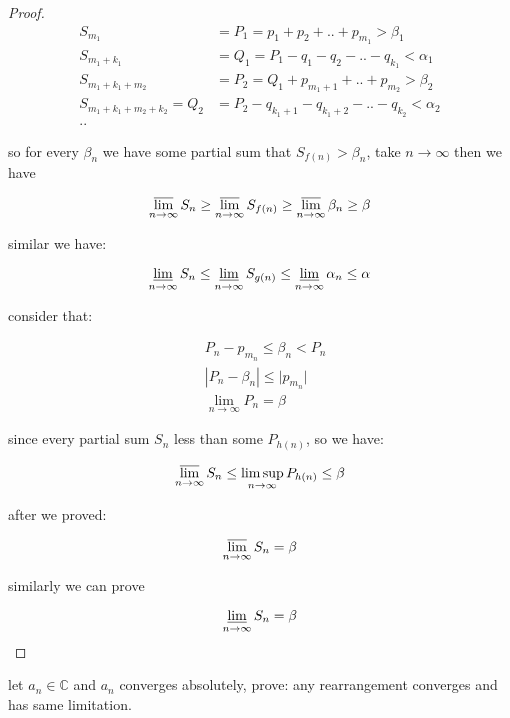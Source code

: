 \begin{proof}
    \begin{align*}
        S_{m_1} & = P_1 = p_1 + p_2 + .. + p_{m_1} > \beta_1\\
        S_{m_1 + k_1} &= Q_1 = P_1 - q_1 -q_2 - .. - q_{k_1} < \alpha_1 \\
        S_{m_1 + k_1 + m_2}  &= P_2 = Q_1 + p_{m_1 + 1} + .. + p_{m_2} > \beta_2 \\
        S_{m_1 + k_1 + m_2 + k_2} =Q_2 &= P_2 - q_{k_1 + 1} -q_{k_1 + 2} - .. - q_{k_2} < \alpha_2 \\
        ..
    \end{align*}

    so for every $\beta_n$ we have some partial sum that $S_{f(n)} > \beta_n$, take $n \to \infty$ then we have

    \[
        \varlimsup_{n \to \infty} S_{n} \ge \varlimsup_{n \to \infty} S_{f(n)} \ge \varlimsup_{n \to \infty} \beta_n \ge \beta
    \]

    similar we have:

    
    \[
           \varliminf_{n \to \infty} S_{n} \le \varliminf_{n \to \infty} S_{g(n)} \le \varliminf_{n \to \infty} \alpha_n \le \alpha
    \]

    consider that:

    \begin{align*}
       & P_n - p_{m_n} \le \beta_n < P_n \\
       & |P_n - \beta_n | \le \lvert p_{m_n} \rvert \\
       & \lim_{n \to \infty} P_n  = \beta
    \end{align*}

    since every partial sum $S_n$ less than some $P_{h(n)}$, so we have:

    \[
        \varlimsup_{n \to \infty}S_n \le \limsup_{n \to \infty}P_{h(n)} \le \beta
    \]

    after we proved:

    \[
        \varlimsup_{n \to \infty}S_n = \beta
    \]

    similarly we can prove

    \[
        \varliminf_{n \to \infty}S_n = \beta
    \]

\end{proof}

\begin{exercise}
    let $a_n \in \mathbb{C}$ and $a_n$ converges absolutely, prove: any rearrangement converges and has same limitation.
\end{exercise}

